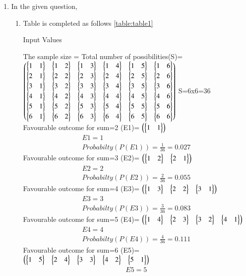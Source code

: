 \renewcommand{\theequation}{\theenumi}
\begin{enumerate}[label=\arabic*.,ref=\thesubsubsection.\theenumi]
\item In the given question,
\\
\begin{enumerate}
\item
Table is completed as follows \ref{table:table1}
\begin{table}[ht!]
\centering

\caption{Input Values}
\label{table:table1}	
\end{table}
The sample size = Total number of possibilities(S)=
$\myvec{\bmat{1&1}&\bmat{1&2}&\bmat{1&3}&\bmat{1&4}&\bmat{1&5}&\bmat{1&6}\\
\bmat{2&1}&\bmat{2&2}&\bmat{2&3}&\bmat{2&4}&\bmat{2&5}&\bmat{2&6}
\\\bmat{3&1}&\bmat{3&2}&\bmat{3&3}&\bmat{3&4}&\bmat{3&5}&\bmat{3&6}
\\\bmat{4&1}&\bmat{4&2}&\bmat{4&3}&\bmat{4&4}&\bmat{4&5}&\bmat{4&6}
\\\bmat{5&1}&\bmat{5&2}&\bmat{5&3}&\bmat{5&4}&\bmat{5&5}&\bmat{5&6}
\\\bmat{6&1}&\bmat{6&2}&\bmat{6&3}&\bmat{6&4}&\bmat{6&5}&\bmat{6&6}}$
S=6x6=36
\\
Favourable outcome for sum=2 (E1)=
$\myvec{\bmat{1&1}}$
\begin{align}
E1=1
\\
Probabilty(P(E1))=\frac{1}{36}=0.027
\end{align}
Favourable outcome for sum=3 (E2)= 
$\myvec{\bmat{1&2}&\bmat{2&1}}$
\begin{align}
E2=2 
\\
Probabilty(P(E2))=\frac{2}{36}=0.055
\end{align}
Favourable outcome for sum=4 (E3)= 
$\myvec{\bmat{1&3}&\bmat{2&2}&\bmat{3&1}}$
\begin{align}
E3=3 
\\
Probabilty(P(E3))=\frac{3}{36}=0.083
\end{align}
Favourable outcome for sum=5 (E4)= 
$\myvec{\bmat{1&4}&\bmat{2&3}&\bmat{3&2}&\bmat{4&1}}$
\begin{align}
E4=4
\\
Probabilty(P(E4))=\frac{4}{36}=0.111
\end{align}
Favourable outcome for sum=6 (E5)= 
$\myvec{\bmat{1&5}&\bmat{2&4}&\bmat{3&3}&\bmat{4&2}&\bmat{5&1}}$
\begin{align}
E5=5
\\

\end{align}
\end{enumerate}
\end{enumerate}
